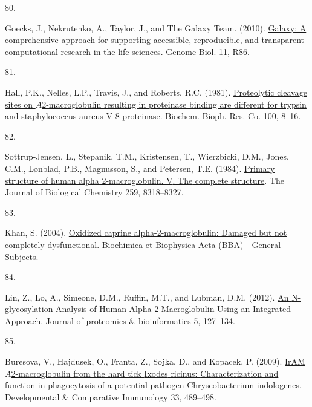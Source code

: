 \documentclass[
]{article}
\newlength{\cslhangindent}
\newlength{\csllabelwidth}
\newlength{\cslentryspacingunit} %
\newenvironment{CSLReferences}[2] %
 {%
  \setlength{\parindent}{0pt}
  \ifodd #1
  \let\oldpar\par
  \def\par{\hangindent=\cslhangindent\oldpar}
  \fi
  \setlength{\parskip}{#2\cslentryspacingunit}
 }%
 {}
\newcommand{\CSLLeftMargin}[1]{\parbox[t]{\csllabelwidth}{#1}}
\newcommand{\CSLRightInline}[1]{\parbox[t]{\linewidth - \csllabelwidth}{#1}\break}
\begin{document}
\begin{CSLReferences}{0}{0}
\leavevmode{}%
\CSLLeftMargin{80. }
\CSLRightInline{Goecks, J., Nekrutenko, A., Taylor, J., and The Galaxy Team. (2010). \href{https://doi.org/10.1186/gb-2010-11-8-r86}{Galaxy: A comprehensive approach for supporting accessible, reproducible, and transparent computational research in the life sciences}. Genome Biol. 11, R86.}

\leavevmode{}%
\CSLLeftMargin{81. }
\CSLRightInline{Hall, P.K., Nelles, L.P., Travis, J., and Roberts, R.C. (1981). \href{https://doi.org/10.1016/S0006-291X(81)80055-1}{Proteolytic cleavage sites on {\(A\)}2-macroglobulin resulting in proteinase binding are different for trypsin and staphylococcus aureus {V-8} proteinase}. Biochem. Bioph. Res. Co. 100, 8--16.}

\leavevmode{}%
\CSLLeftMargin{82. }
\CSLRightInline{Sottrup-Jensen, L., Stepanik, T.M., Kristensen, T., Wierzbicki, D.M., Jones, C.M., Lønblad, P.B., Magnusson, S., and Petersen, T.E. (1984). \href{https://www.ncbi.nlm.nih.gov/pubmed/6203908}{Primary structure of human alpha 2-macroglobulin. {V}. {The} complete structure}. The Journal of Biological Chemistry 259, 8318--8327.}

\leavevmode{}%
\CSLLeftMargin{83. }
\CSLRightInline{Khan, S. (2004). \href{https://doi.org/10.1016/j.bbagen.2004.06.008}{Oxidized caprine alpha-2-macroglobulin: Damaged but not completely dysfunctional}. Biochimica et Biophysica Acta (BBA) - General Subjects.}

\leavevmode{}%
\CSLLeftMargin{84. }
\CSLRightInline{Lin, Z., Lo, A., Simeone, D.M., Ruffin, M.T., and Lubman, D.M. (2012). \href{https://doi.org/10.4172/jpb.1000224}{An {N-glycosylation Analysis} of {Human Alpha-2-Macroglobulin Using} an {Integrated Approach}}. Journal of proteomics \& bioinformatics 5, 127--134.}

\leavevmode{}%
\CSLLeftMargin{85. }
\CSLRightInline{Buresova, V., Hajdusek, O., Franta, Z., Sojka, D., and Kopacek, P. (2009). \href{https://doi.org/10.1016/j.dci.2008.09.011}{{IrAM}\textemdash{{An}} {\(A\)}2-macroglobulin from the hard tick {Ixodes} ricinus: {Characterization} and function in phagocytosis of a potential pathogen {Chryseobacterium} indologenes}. Developmental \& Comparative Immunology 33, 489--498.}


\end{CSLReferences}
\end{document}
